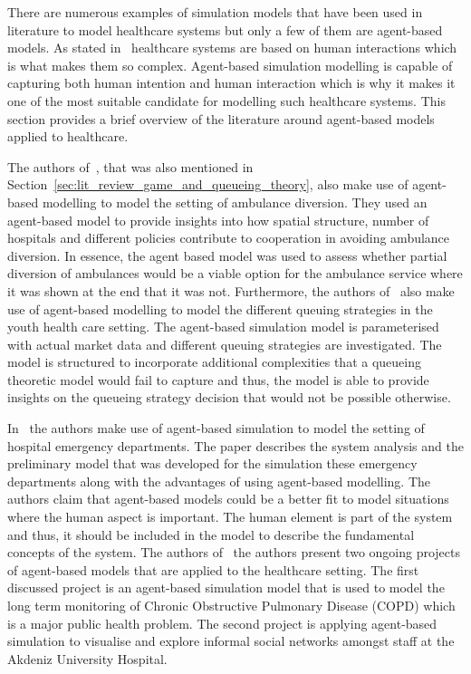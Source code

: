 There are numerous examples of simulation models that have been used in
literature to model healthcare systems but only a few of them are agent-based
models.
As stated in~\cite{EscuderoMarin20111239} healthcare systems are based on human
interactions which is what makes them so complex.
Agent-based simulation modelling is capable of capturing both human intention
and human interaction which is why it makes it one of the most suitable
candidate for modelling such healthcare systems.
This section provides a brief overview of the literature around agent-based
models applied to healthcare.

The authors of~\cite{hagtvedt2009cooperative}, that was also mentioned in
Section~\ref{sec:lit_review_game_and_queueing_theory}, also make use of
agent-based modelling to model the setting of ambulance diversion. 
They used an agent-based model to provide insights into how spatial structure,
number of hospitals and different policies contribute to cooperation in
avoiding ambulance diversion.
In essence, the agent based model was used to assess whether partial diversion
of ambulances would be a viable option for the ambulance service where it
was shown at the end that it was not.
Furthermore, the authors of~\cite{Giesen2009} also make use of agent-based
modelling to model the different queuing strategies in the youth health care
setting.
The agent-based simulation model is parameterised with actual market data and
different queuing strategies are investigated.
The model is structured to incorporate additional complexities that a queueing
theoretic model would fail to capture and thus, the model is able to provide
insights on the queueing strategy decision that would not be possible
otherwise.

In~\cite{Stainsby2009536} the authors make use of agent-based simulation to
model the setting of hospital emergency departments.
The paper describes the system analysis and the preliminary model that was
developed for the simulation these emergency departments along with the
advantages of using agent-based modelling.
The authors claim that agent-based models could be a better fit to model
situations where the human aspect is important.
The human element is part of the system and thus, it should be included in the
model to describe the fundamental concepts of the system.
The authors of~\cite{Bilge2006699} the authors present two ongoing projects of
agent-based models that are applied to the healthcare setting.
The first discussed project is an agent-based simulation model that is used to
model the long term monitoring of Chronic Obstructive Pulmonary Disease (COPD)
which is a major public health problem.
The second project is applying agent-based simulation to visualise and explore
informal social networks amongst staff at the Akdeniz University Hospital.




